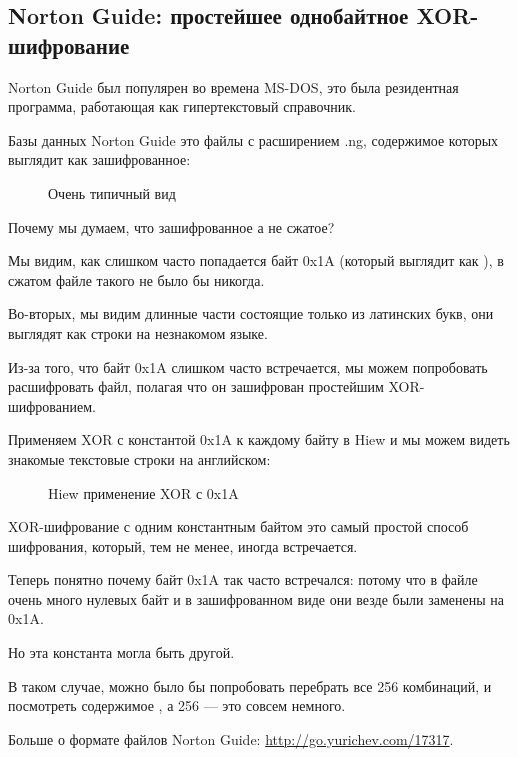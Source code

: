 \clearpage
\subsection{Norton Guide: простейшее однобайтное XOR-шифрование}
\label{norton_guide}

Norton Guide был популярен во времена MS-DOS, это была резидентная программа, работающая как
гипертекстовый справочник.

Базы данных Norton Guide это файлы с расширением .ng, содержимое которых выглядит как зашифрованное:

\begin{figure}[H]
\centering
{}
\caption{Очень типичный вид}
\end{figure}

Почему мы думаем, что зашифрованное а не сжатое? 

Мы видим, как слишком часто попадается байт 0x1A (который выглядит как \q{$\rightarrow$}), в сжатом файле такого не было бы никогда.

Во-вторых, мы видим длинные части состоящие только из латинских букв, они выглядят как строки
на незнакомом языке.

\clearpage

Из-за того, что байт 0x1A слишком часто встречается, мы можем попробовать расшифровать файл, полагая
что он зашифрован простейшим XOR-шифрованием.

Применяем XOR с константой 0x1A к каждому байту в Hiew и мы можем видеть знакомые текстовые строки на английском:

\begin{figure}[H]
\centering
{}
\caption{Hiew применение XOR с 0x1A}
\end{figure}

XOR-шифрование с одним константным байтом это самый простой способ шифрования, который, тем не менее, иногда
встречается.

Теперь понятно почему байт 0x1A так часто встречался: потому что в файле очень много нулевых байт 
и в зашифрованном виде они везде были заменены на 0x1A.

Но эта константа могла быть другой.

В таком случае, можно было бы попробовать перебрать все 256 комбинаций, и посмотреть содержимое , 
а 256 --- это совсем немного.

Больше о формате файлов Norton Guide: \url{http://go.yurichev.com/17317}.

